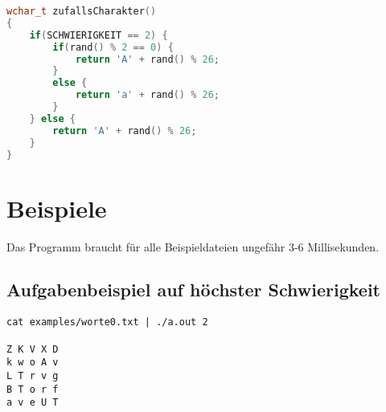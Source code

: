 \documentclass[a4paper,10pt,ngerman]{scrartcl}
\begin{document}
\begin{lstlisting}[language=C++]
wchar_t zufallsCharakter()
{
    if(SCHWIERIGKEIT == 2) {
        if(rand() % 2 == 0) {
            return 'A' + rand() % 26;
        }
        else {
            return 'a' + rand() % 26;
        }
    } else {
        return 'A' + rand() % 26;
    }
}
\end{lstlisting}

\section{Beispiele}
Das Programm braucht für alle Beispieldateien ungefähr 3-6 Millisekunden.
\subsection*{Aufgabenbeispiel auf höchster Schwierigkeit}
\begin{lstlisting}
cat examples/worte0.txt | ./a.out 2

Z K V X D
k w o A v
L T r v g
B T o r f
a v e U T
\end{lstlisting}
\end{document}
